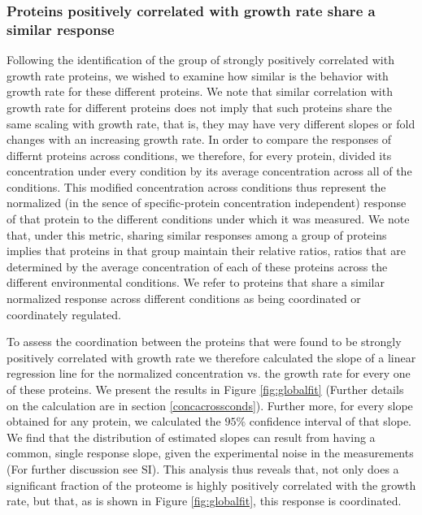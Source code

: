 \documentclass[notitlepage]{article}
\begin{document}
\subsubsection{Proteins positively correlated with growth rate share a similar response}
\label{propchange}
Following the identification of the group of strongly positively correlated with growth rate proteins, we wished to examine how similar is the behavior with growth rate for these different proteins.
We note that similar correlation with growth rate for different proteins does not imply that such proteins share the same scaling with growth rate, that is,  they may have very different slopes or fold changes with an increasing growth rate.
In order to compare the responses of differnt proteins across conditions, we therefore, for every protein, divided its concentration under every condition by its average concentration across all of the conditions.
This modified concentration across conditions thus represent the normalized (in the sence of specific-protein concentration independent) response of that protein to the different conditions under which it was measured.
We note that, under this metric, sharing similar responses among a group of proteins implies that proteins in that group maintain their relative ratios, ratios that are determined by the average concentration of each of these proteins across the different environmental conditions.
We refer to proteins that share a similar normalized response across different conditions as being coordinated or coordinately regulated.

To assess the coordination between the proteins that were found to be strongly positively correlated with growth rate we therefore calculated the slope of a linear regression line for the normalized concentration vs. the growth rate for every one of these proteins.
We present the results in Figure \ref{fig:globalfit} (Further details on the calculation are in section \ref{concacrossconds}).
Further more, for every slope obtained for any protein, we calculated the $95\%$ confidence interval of that slope.
We find that the distribution of estimated slopes can result from having a common, single response slope, given the experimental noise in the measurements (For further discussion see SI).
This analysis thus reveals that, not only does a significant fraction of the proteome is highly positively correlated with the growth rate, but that, as is shown in Figure \ref{fig:globalfit}, this response is coordinated.
\end{document}
